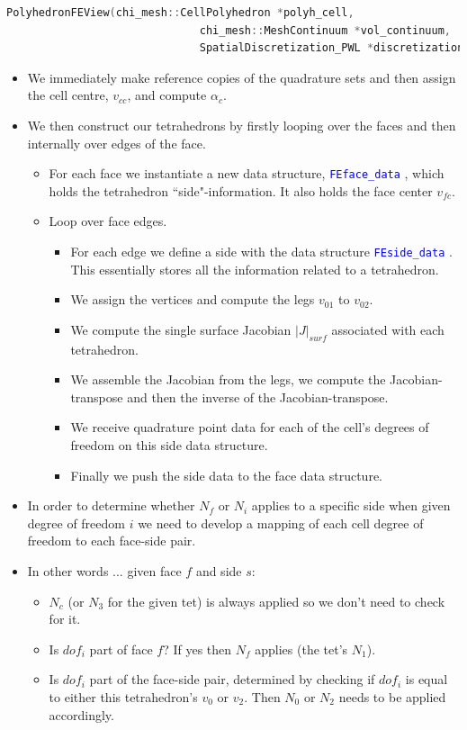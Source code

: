 \documentclass[11pt,letterpaper,titlepage]{article}
\newcommand{\xmltag}[1]{\textcolor{blue}{ \texttt{#1}} }
\begin{document}
\begin{lstlisting}[language=c++]
PolyhedronFEView(chi_mesh::CellPolyhedron *polyh_cell,
                              chi_mesh::MeshContinuum *vol_continuum,
                              SpatialDiscretization_PWL *discretization)
\end{lstlisting}

\begin{itemize}
\item We immediately make reference copies of the quadrature sets and then assign the cell centre, $v_{cc}$, and compute $\alpha_c$.
\item We then construct our tetrahedrons by firstly looping over the faces and then internally over edges of the face.
\begin{itemize}
\item For each face we instantiate a new data structure, \xmltag{FEface\_data}, which holds the tetrahedron ``side"-information. It also holds the face center $v_{fc}$. 
\item Loop over face edges.
\begin{itemize}
\item For each edge we define a side with the data structure \xmltag{FEside\_data}. This essentially stores all the information related to a tetrahedron.
\item We assign the vertices and compute the legs $v_{01}$ to $v_{02}$.
\item We compute the single surface Jacobian $|J|_{surf}$ associated with each tetrahedron.
\item We assemble the Jacobian from the legs, we compute the Jacobian-transpose and then the inverse of the Jacobian-transpose.
\item We receive quadrature point data for each of the cell's degrees of freedom on this side data structure.
\item Finally we push the side data to the face data structure.
\end{itemize}
\end{itemize}


\item In order to determine whether $N_f$ or $N_i$ applies to a specific side when given degree of freedom $i$ we need to develop a mapping of each cell degree of freedom to each face-side pair.
\item In other words ... given face $f$ and side $s$:
\begin{itemize}
\item $N_c$ (or $N_3$ for the given tet) is always applied so we don't need to check for it.
\item Is $dof_i$ part of face $f$? If yes then $N_f$ applies (the tet's $N_1$). 
\item Is $dof_i$ part of the face-side pair, determined by checking if $dof_i$ is equal to either this tetrahedron's $v_0$ or $v_2$. Then $N_0$ or $N_2$ needs to be applied accordingly.
\end{itemize}


\end{itemize}
\end{document}
